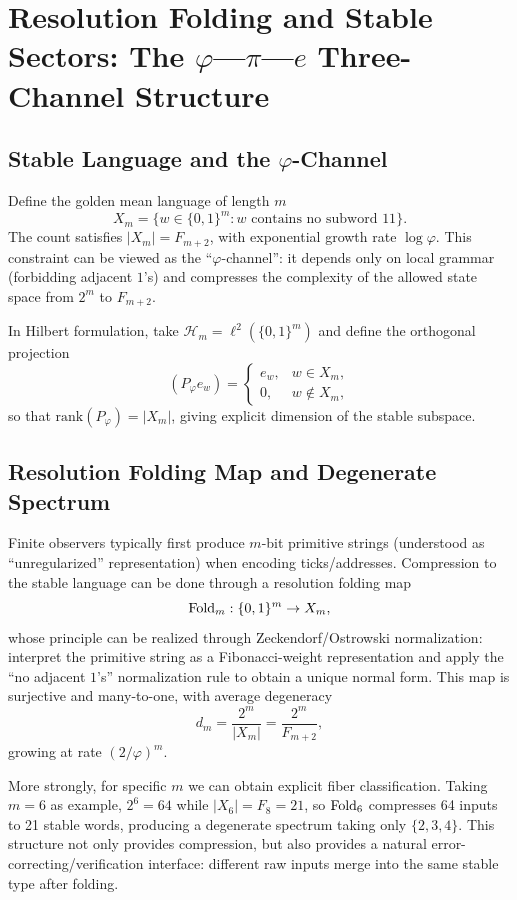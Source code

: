 \section{Resolution Folding and Stable Sectors: The $\varphi$---$\pi$---$e$ Three-Channel Structure}

\subsection{Stable Language and the $\varphi$-Channel}

Define the golden mean language of length $m$
\[
X_m=\{w\in\{0,1\}^m:\text{$w$ contains no subword }11\}.
\]
The count satisfies $|X_m|=F_{m+2}$, with exponential growth rate $\log\varphi$. This constraint can be viewed as the ``$\varphi$-channel'': it depends only on local grammar (forbidding adjacent $1$'s) and compresses the complexity of the allowed state space from $2^m$ to $F_{m+2}$.

In Hilbert formulation, take $\mathcal{H}_m=\ell^2(\{0,1\}^m)$ and define the orthogonal projection
\[
(P_\varphi e_w)=
\begin{cases}
e_w,&w\in X_m,\\
0,&w\notin X_m,
\end{cases}
\]
so that $\mathrm{rank}(P_\varphi)=|X_m|$, giving explicit dimension of the stable subspace.

\subsection{Resolution Folding Map and Degenerate Spectrum}

Finite observers typically first produce $m$-bit primitive strings (understood as ``unregularized'' representation) when encoding ticks/addresses. Compression to the stable language can be done through a resolution folding map
\[
\mathrm{Fold}_m:\{0,1\}^m\to X_m,
\]
whose principle can be realized through Zeckendorf/Ostrowski normalization: interpret the primitive string as a Fibonacci-weight representation and apply the ``no adjacent $1$'s'' normalization rule to obtain a unique normal form. This map is surjective and many-to-one, with average degeneracy
\[
d_m=\frac{2^m}{|X_m|}=\frac{2^m}{F_{m+2}},
\]
growing at rate $(2/\varphi)^m$.

More strongly, for specific $m$ we can obtain explicit fiber classification. Taking $m=6$ as example, $2^6=64$ while $|X_6|=F_8=21$, so $\mathrm{Fold}_6$ compresses 64 inputs to 21 stable words, producing a degenerate spectrum taking only $\{2,3,4\}$. This structure not only provides compression, but also provides a natural error-correcting/verification interface: different raw inputs merge into the same stable type after folding.

